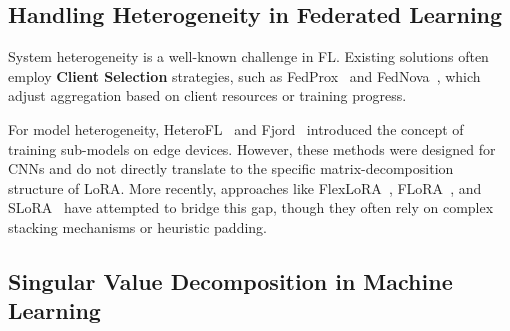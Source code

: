 \documentclass[conference]{IEEEtran}
\begin{document}
\subsection{Handling Heterogeneity in Federated Learning}

System heterogeneity is a well-known challenge in FL. Existing solutions often employ \textbf{Client Selection} strategies, such as FedProx~\cite{li2020fedprox} and FedNova~\cite{wang2020fednova}, which adjust aggregation based on client resources or training progress. 

For model heterogeneity, HeteroFL~\cite{diao2020heterofl} and Fjord~\cite{horvath2021fjord} introduced the concept of training sub-models on edge devices. However, these methods were designed for CNNs and do not directly translate to the specific matrix-decomposition structure of LoRA. More recently, approaches like FlexLoRA~\cite{bai2024flexlora}, FLoRA~\cite{wang2024flora}, and SLoRA~\cite{babakniya2024slora} have attempted to bridge this gap, though they often rely on complex stacking mechanisms or heuristic padding.

\subsection{Singular Value Decomposition in Machine Learning}
\end{document}
